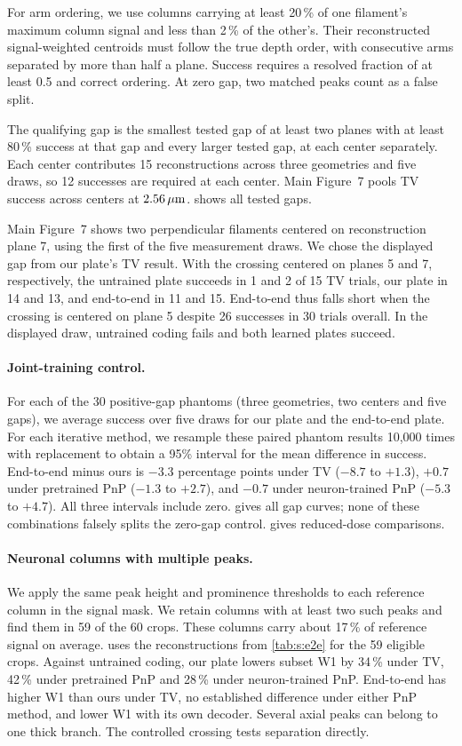 For arm ordering, we use columns carrying at least 20\,\% of one filament's maximum column signal and less than 2\,\% of the other's. Their reconstructed signal-weighted centroids must follow the true depth order, with consecutive arms separated by more than half a plane. Success requires a resolved fraction of at least 0.5 and correct ordering. At zero gap, two matched peaks count as a false split.

The qualifying gap is the smallest tested gap of at least two planes with at least 80\,\% success at that gap and every larger tested gap, at each center separately. Each center contributes 15 reconstructions across three geometries and five draws, so 12 successes are required at each center. Main Figure~7 pools TV success across centers at $2.56\,\mu\mathrm{m}$.  shows all tested gaps.

Main Figure~7 shows two perpendicular filaments centered on reconstruction plane 7, using the first of the five measurement draws. We chose the displayed gap from our plate's TV result. With the crossing centered on planes 5 and 7, respectively, the untrained plate succeeds in 1 and 2 of 15 TV trials, our plate in 14 and 13, and end-to-end in 11 and 15. End-to-end thus falls short when the crossing is centered on plane 5 despite 26 successes in 30 trials overall. In the displayed draw, untrained coding fails and both learned plates succeed.

\paragraph{Joint-training control.}
For each of the 30 positive-gap phantoms (three geometries, two centers and five gaps), we average success over five draws for our plate and the end-to-end plate. For each iterative method, we resample these paired phantom results 10,000 times with replacement to obtain a 95\% interval for the mean difference in success. End-to-end minus ours is $-3.3$ percentage points under TV ($-8.7$ to $+1.3$), $+0.7$ under pretrained PnP ($-1.3$ to $+2.7$), and $-0.7$ under neuron-trained PnP ($-5.3$ to $+4.7$). All three intervals include zero.  gives all gap curves; none of these combinations falsely splits the zero-gap control.  gives reduced-dose comparisons.

\paragraph{Neuronal columns with multiple peaks.}
We apply the same peak height and prominence thresholds to each reference column in the signal mask. We retain columns with at least two such peaks and find them in 59 of the 60 crops. These columns carry about 17\,\% of reference signal on average.  uses the reconstructions from \cref{tab:s:e2e} for the 59 eligible crops. Against untrained coding, our plate lowers subset W1 by 34\,\% under TV, 42\,\% under pretrained PnP and 28\,\% under neuron-trained PnP. End-to-end has higher W1 than ours under TV, no established difference under either PnP method, and lower W1 with its own decoder. Several axial peaks can belong to one thick branch. The controlled crossing tests separation directly.

